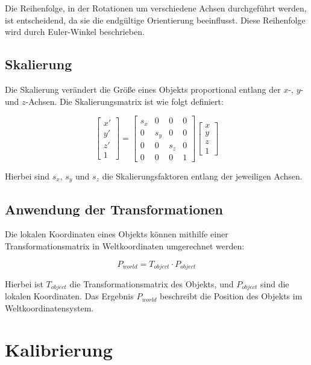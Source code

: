 Die Reihenfolge, in der Rotationen um verschiedene Achsen durchgeführt werden, ist entscheidend, da sie die endgültige Orientierung beeinflusst. Diese Reihenfolge wird durch Euler-Winkel beschrieben.

\subsection{Skalierung}

Die Skalierung verändert die Größe eines Objekts proportional entlang der \(x\)-, \(y\)- und \(z\)-Achsen. Die Skalierungsmatrix ist wie folgt definiert:

\begin{equation}
\begin{bmatrix}
x' \\ y' \\ z' \\ 1
\end{bmatrix}
=
\begin{bmatrix}
s_x & 0 & 0 & 0 \\
0 & s_y & 0 & 0 \\
0 & 0 & s_z & 0 \\
0 & 0 & 0 & 1
\end{bmatrix}
\begin{bmatrix}
x \\ y \\ z \\ 1
\end{bmatrix}
\end{equation}

Hierbei sind \(s_x\), \(s_y\) und \(s_z\) die Skalierungsfaktoren entlang der jeweiligen Achsen.

\subsection{Anwendung der Transformationen}

Die lokalen Koordinaten eines Objekts können mithilfe einer Transformationsmatrix in Weltkoordinaten umgerechnet werden:

\begin{equation}
P_{world} = T_{object} \cdot P_{object}
\end{equation}

Hierbei ist \(T_{object}\) die Transformationsmatrix des Objekts, und \(P_{object}\) sind die lokalen Koordinaten. Das Ergebnis \(P_{world}\) beschreibt die Position des Objekts im Weltkoordinatensystem.

\section{Kalibrierung}

